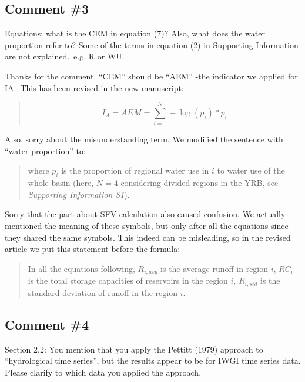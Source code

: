 \subsection{Comment \#3}
\RC{} Equations: what is the CEM in equation (7)? Also, what does the water proportion refer to? Some of the terms in equation (2) in Supporting Information are not explained.\ e.g. R or WU.\

\AR{} Thanks for the comment. ``CEM'' should be ``AEM'' -the indicator we applied for IA.\ This has been revised in the new manuscript:

\begin{quote}
    \begin{equation}
		I_A = AEM = \sum_{i=1}^N - \log(p_{i}) * p_{i}
	\end{equation}
\end{quote}

\AR*{} Also, sorry about the misunderstanding term. We modified the sentence with ``water proportion'' to:

\begin{quote}
    where $p_{i}$ is the proportion of regional water use in $i$ to water use of the whole basin (here, $N=4$ considering divided regions in the YRB, see \textit{Supporting Information S1}).
\end{quote}

\AR*{} Sorry that the part about SFV calculation also caused confusion. We actually mentioned the meaning of these symbols, but only after all the equations since they shared the same symbols. This indeed can be misleading, so in the revised article we put this statement before the formula:

\begin{quote}
    In all the equations following, $R_{i, avg}$ is the average runoff in region $i$, $RC_i$ is the total storage capacities of reservoirs in the region $i$, $R_{i, std}$ is the standard deviation of runoff in the region $i$.
\end{quote}

\subsection{Comment \#4}
\RC{} Section 2.2: You mention that you apply the Pettitt (1979) approach to ``hydrological time series'', but the results appear to be for IWGI time series data. Please clarify to which data you applied the approach.

